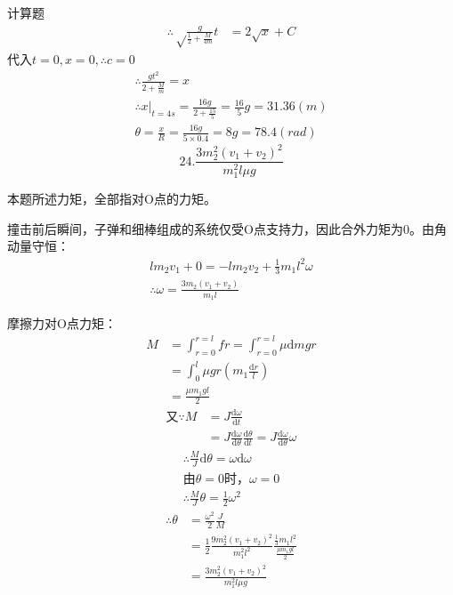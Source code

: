 \documentclass[a4paper,fleqn,twocolumn]{ctexart}
\newcommand{\di}[1]{\mathrm{d}#1}
\newcommand{\dy}[2]{\frac{\di{#1}}{\di{#2}}}
\begin{document}
\begin{section}{计算题}
\begin{align*}
			\therefore \sqrt\frac{g}{\frac{1}{2}+\frac{M}{4m}}t&=2\sqrt{x}+C
		\end{align*}
		代入$ t=0,x=0,\therefore c=0 $
		\begin{gather*}
			\therefore \frac{gt^2}{2+\frac{M}{m}}=x\\
			\therefore x\left.\right|_{t=4s}=\frac{16g}{2+\frac{15}{5}}=\frac{16}{5}g=31.36(m)\\
			\theta=\frac{x}{R}=\frac{16g}{5\times 0.4}=8g=78.4(rad)
		\end{gather*}
		\[24.\frac{3m_2^2(v_1+v_2)^2}{m_1^2l\mu g}\]\par
		本题所述力矩，全部指对O点的力矩。\par
		撞击前后瞬间，子弹和细棒组成的系统仅受O点支持力，因此合外力矩为0。由角动量守恒：
		\begin{gather*}
			lm_2v_1+0=-lm_2v_2+\frac{1}{3}m_1l^2\omega\\
			\therefore \omega=\frac{3m_2(v_1+v_2)}{m_1l}
		\end{gather*}\par
		摩擦力对O点力矩：
		\begin{align*}
			M	&=\int_{r=0}^{r=l}fr=\int_{r=0}^{r=l}\mu \di{m}gr\\
				&=\int_0^l\mu gr\left(m_1\frac{\di{r}}{l}\right)\\
				&=\frac{\mu m_1gl}{2}
		\end{align*}
		\begin{align*}
			\text{又}\because M&=J\dy{\omega}{t}\\
			&=J\dy{\omega}{\theta}\dy{\theta}{t}=J\dy{\omega}{\theta}\omega
		\end{align*}
		\begin{gather*}
			\therefore \frac{M}{J}\di{\theta}=\omega\di{\omega}\\
			\text{由}\theta=0\text{时}，\omega=0\\
			\therefore \frac{M}{J}\theta=\frac{1}{2}\omega^2
		\end{gather*}
		\begin{align*}
			\therefore \theta&=\frac{\omega^2}{2}\frac{J}{M}\\
			&=\frac{1}{2}\frac{9m_2^2(v_1+v_2)^2}{m_1^2l^2}\frac{\frac{1}{3}m_1l^2}{\frac{\mu m_1gl}{2}}\\
			&=\frac{3m_2^2(v_1+v_2)^2}{m_1^2l\mu g}
		\end{align*}
	\end{section}
\end{document}
